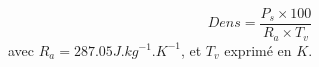 $$
Dens = \frac{P_s\times 100}{R_a \times T_v}
$$
avec $R_a = 287.05 J.kg^{-1}.K^{-1} $, et $T_v$ exprim\'e 
en $K$.
